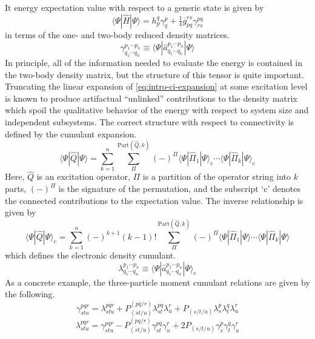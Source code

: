 It energy expectation value with respect to a generic state is given by
\begin{equation}
    \langle\Psi|
    \hat{H}
    |\Psi\rangle
    =
    h_p^q
    \gamma^p_q
    +
    \tfrac{1}{4}
    \overline{g}_{pq}^{rs}
    \gamma^{pq}_{rs}
\end{equation}
in terms of the one- and two-body reduced density matrices.
\begin{equation}
    \gamma^{p_1\cdots p_h}_{q_1\cdots q_h}
    \equiv
    \langle\Psi|\hat{a}^{p_1\cdots p_h}_{q_1\cdots q_h}|\Psi\rangle
\end{equation}
In principle, all of the information needed to evaluate the energy is contained
in the two-body density matrix, but the structure of this tensor is quite
important.
Truncating the linear expansion of \cref{eq:intro-ci-expansion} at some
excitation level is known to produce artifactual ``unlinked'' contributions to
the density matrix which spoil the qualitative behavior of the energy with
respect to system size and independent subsystems.
The correct structure with respect to connectivity is defined by the cumulant
expansion.\cite{McCullagh:1987}
\begin{equation}
    \langle\Psi|\hat{Q}|\Psi\rangle
    =
    \sum_{k=1}^n
    \sum_{\Pi}^{\mathrm{Part}(\hat{Q}, k)}
    (-)^{\Pi}
    \langle\Psi|\hat{\Pi}_1|\Psi\rangle_\mathrm{c}
    \cdots
    \langle\Psi|\hat{\Pi}_k|\Psi\rangle_\mathrm{c}
\end{equation}
Here, \(\hat{Q}\) is an excitation operator, \(\Pi\) is a partition of the
operator string into \(k\) parts, \((-)^\Pi\) is the signature of the
permutation, and the subscript `\(\mathrm{c}\)' denotes the connected
contributions to the expectation value.
The inverse relationship is given by
\begin{equation}
    \langle\Psi|\hat{Q}|\Psi\rangle_\mathrm{c}
    =
    \sum_{k=1}^n
    (-)^{k+1}
    (k-1)!
    \sum_{\Pi}^{\mathrm{Part}(\hat{Q}, k)}
    (-)^{\Pi}
    \langle\Psi|\hat{\Pi}_1|\Psi\rangle
    \cdots
    \langle\Psi|\hat{\Pi}_k|\Psi\rangle
\end{equation}
which defines the electronic density cumulant.
\begin{equation}
    \lambda^{p_1\cdots p_n}_{q_1\cdots q_n}
    \equiv
    \langle\Psi|\hat{a}^{p_1\cdots p_n}_{q_1\cdots q_n}|\Psi\rangle_\mathrm{c}
\end{equation}
As a concrete example, the three-particle moment cumulant relations are given by
the following.
\begin{equation}
    \gamma^{pqr}_{stu}
    =
    \lambda^{pqr}_{stu}
    +
    P^{(pq/r)}_{(st/u)}
    \lambda^{pq}_{st}
    \lambda^r_u
    +
    P_{(s/t/u)}
    \lambda^p_s
    \lambda^q_t
    \lambda^r_u
\end{equation}
\begin{equation}
    \lambda^{pqr}_{stu}
    =
    \gamma^{pqr}_{stu}
    -
    P^{(pq/r)}_{(st/u)}
    \gamma^{pq}_{st}
    \gamma^r_u
    +
    2
    P_{(s/t/u)}
    \gamma^p_s
    \gamma^q_t
    \gamma^r_u
\end{equation}

